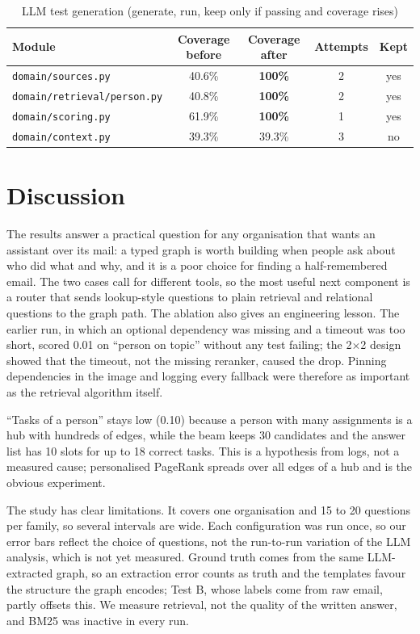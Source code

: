 \documentclass[12pt,onecolumn,draftclsnofoot]{IEEEtran}
\begin{document}
\begin{table}[t]
\centering
\caption{LLM test generation (generate, run, keep only if passing and coverage rises)}
\label{tab:testgen}
\footnotesize
\begin{tabular}{@{}lcccc@{}}
\toprule
Module & Coverage before & Coverage after & Attempts & Kept \\
\midrule
\texttt{domain/sources.py} & 40.6\% & \textbf{100\%} & 2 & yes \\
\texttt{domain/retrieval/person.py} & 40.8\% & \textbf{100\%} & 2 & yes \\
\texttt{domain/scoring.py} & 61.9\% & \textbf{100\%} & 1 & yes \\
\texttt{domain/context.py} & 39.3\% & 39.3\% & 3 & no \\
\bottomrule
\end{tabular}
\end{table}

\section{Discussion}

The results answer a practical question for any organisation that wants an assistant over its mail: a typed graph is worth building when people ask about who did what and why, and it is a poor choice for finding a half-remembered email. The two cases call for different tools, so the most useful next component is a router that sends lookup-style questions to plain retrieval and relational questions to the graph path. The ablation also gives an engineering lesson. The earlier run, in which an optional dependency was missing and a timeout was too short, scored 0.01 on ``person on topic'' without any test failing; the 2$\times$2 design showed that the timeout, not the missing reranker, caused the drop. Pinning dependencies in the image and logging every fallback were therefore as important as the retrieval algorithm itself.

``Tasks of a person'' stays low (0.10) because a person with many assignments is a hub with hundreds of edges, while the beam keeps 30 candidates and the answer list has 10 slots for up to 18 correct tasks. This is a hypothesis from logs, not a measured cause; personalised PageRank \cite{gutierrez2024hipporag} spreads over all edges of a hub and is the obvious experiment.

The study has clear limitations. It covers one organisation and 15 to 20 questions per family, so several intervals are wide. Each configuration was run once, so our error bars reflect the choice of questions, not the run-to-run variation of the LLM analysis, which is not yet measured. Ground truth comes from the same LLM-extracted graph, so an extraction error counts as truth and the templates favour the structure the graph encodes; Test B, whose labels come from raw email, partly offsets this. We measure retrieval, not the quality of the written answer, and BM25 was inactive in every run.
\end{document}
